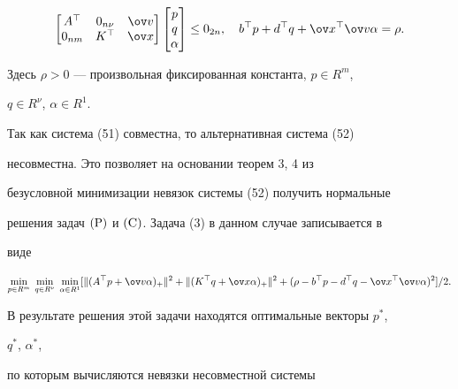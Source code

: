 \begin{equation}


\begin{bmatrix}


A^\top & 0_{n\nu} & \ov v \\ 0_{nm} & K^\top & \ov x


\end{bmatrix}


\begin{bmatrix}


p \\ q \\ \alpha


\end{bmatrix}


\le0_{2n},\quad b^\top p+d^\top q+\ov x^\top\ov v\alpha=\rho.


\end{equation}


Здесь $\rho>0$ --- произвольная фиксированная константа, $p\in R^m$, 


$q\in R^\nu$, $\alpha\in R^1$.





Так как система (51) совместна, то альтернативная система (52)


несовместна. Это позволяет на основании теорем 3, 4 из


безусловной минимизации невязок системы (52) получить нормальные


решения задач $(\mathrm P)$ и $(\mathrm C)$. Задача (3) в данном случае записывается в


виде


\begin{equation}


\min_{p\in R^m}\;\min_{q\in R^\nu}\; \min_{\alpha\in R^1}


[\|(A^\top p+\ov v\alpha)_+\|^2+


\|(K^\top q+\ov x\alpha)_+\|^2+


(\rho-b^\top p-d^\top q-\ov x^\top\ov v\alpha)^2]/2.


\end{equation}





В результате решения этой задачи находятся оптимальные векторы $p^*$, 


$q^*$, $\alpha^*$,


по которым вычисляются невязки несовместной системы


$$



